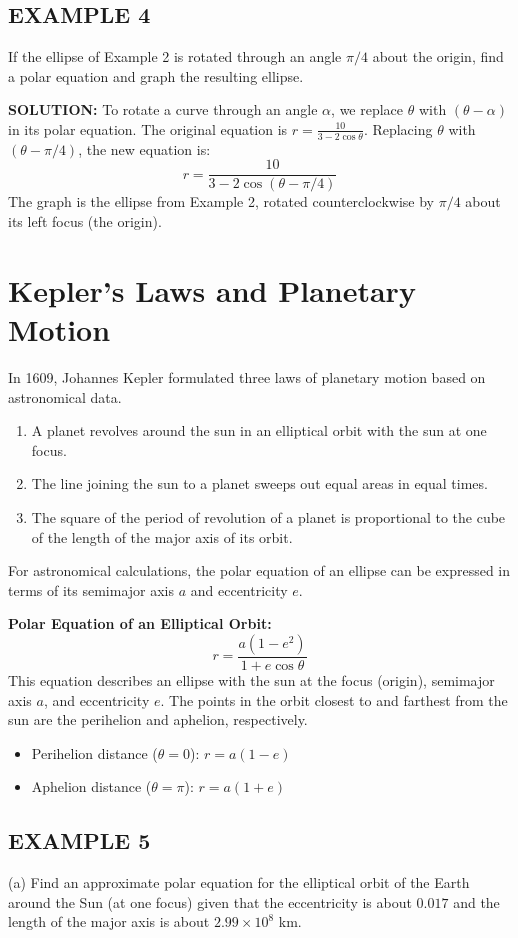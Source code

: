 \documentclass{article}
\begin{document}
\subsection*{EXAMPLE 4}
If the ellipse of Example 2 is rotated through an angle $\pi/4$ about the origin, find a polar equation and graph the resulting ellipse.

\textbf{SOLUTION:}
To rotate a curve through an angle $\alpha$, we replace $\theta$ with $(\theta - \alpha)$ in its polar equation. The original equation is $r = \frac{10}{3 - 2 \cos\theta}$. Replacing $\theta$ with $(\theta - \pi/4)$, the new equation is:
\[
r = \frac{10}{3 - 2 \cos(\theta - \pi/4)}
\]
The graph is the ellipse from Example 2, rotated counterclockwise by $\pi/4$ about its left focus (the origin).

\section*{Kepler's Laws and Planetary Motion}
In 1609, Johannes Kepler formulated three laws of planetary motion based on astronomical data.
\begin{enumerate}
    \item A planet revolves around the sun in an elliptical orbit with the sun at one focus.
    \item The line joining the sun to a planet sweeps out equal areas in equal times.
    \item The square of the period of revolution of a planet is proportional to the cube of the length of the major axis of its orbit.
\end{enumerate}
For astronomical calculations, the polar equation of an ellipse can be expressed in terms of its semimajor axis $a$ and eccentricity $e$.

\textbf{Polar Equation of an Elliptical Orbit:}
\[
r = \frac{a(1 - e^2)}{1 + e \cos\theta}
\]
This equation describes an ellipse with the sun at the focus (origin), semimajor axis $a$, and eccentricity $e$.
The points in the orbit closest to and farthest from the sun are the perihelion and aphelion, respectively.
\begin{itemize}
    \item Perihelion distance ($\theta = 0$): $r = a(1 - e)$
    \item Aphelion distance ($\theta = \pi$): $r = a(1 + e)$
\end{itemize}

\subsection*{EXAMPLE 5}
(a) Find an approximate polar equation for the elliptical orbit of the Earth around the Sun (at one focus) given that the eccentricity is about $0.017$ and the length of the major axis is about $2.99 \times 10^8$ km.
\end{document}
